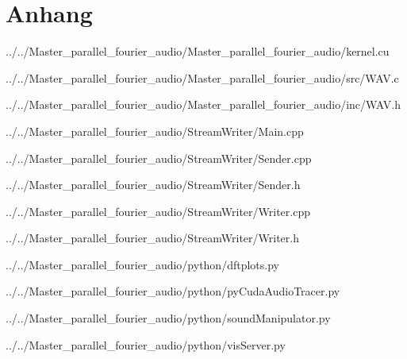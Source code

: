 \section{Anhang}


{../../Master\_parallel\_fourier\_audio/Master\_parallel\_fourier\_audio/kernel.cu}
\newpage


{../../Master\_parallel\_fourier\_audio/Master\_parallel\_fourier\_audio/src/WAV.c}
\newpage


{../../Master\_parallel\_fourier\_audio/Master\_parallel\_fourier\_audio/inc/WAV.h}
\newpage


{../../Master\_parallel\_fourier\_audio/StreamWriter/Main.cpp}
\newpage


{../../Master\_parallel\_fourier\_audio/StreamWriter/Sender.cpp}
\newpage


{../../Master\_parallel\_fourier\_audio/StreamWriter/Sender.h}
\newpage


{../../Master\_parallel\_fourier\_audio/StreamWriter/Writer.cpp}
\newpage


{../../Master\_parallel\_fourier\_audio/StreamWriter/Writer.h}
\newpage



{../../Master\_parallel\_fourier\_audio/python/dftplots.py}
\newpage


{../../Master\_parallel\_fourier\_audio/python/pyCudaAudioTracer.py}
\newpage


{../../Master\_parallel\_fourier\_audio/python/soundManipulator.py}
\newpage


{../../Master\_parallel\_fourier\_audio/python/visServer.py}

